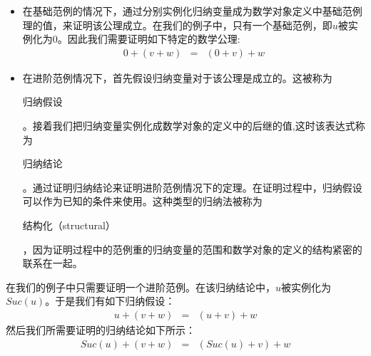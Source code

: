 \documentclass[twocolumn]{article}
\begin{document}
\begin{CJK}{UTF8}{gbsn}
\begin{itemize}
\item 在基础范例的情况下，通过分别实例化归纳变量成为数学对象定义中基础范例理的值，来证明该公理成立。在我们的例子中，只有一个基础范例，即$u$被实例化为$0$。因此我们需要证明如下特定的数学公理:
\begin{eqnarray*}
 0+(v+w) & = & (0+v)+w
\end{eqnarray*}
\item 在进阶范例情况下，首先假设归纳变量对于该公理是成立的。这被称为\begin{CJK}{UTF8}{gkai}归纳假设\end{CJK}。接着我们把归纳变量实例化成数学对象的定义中的后继的值,这时该表达式称为\begin{CJK}{UTF8}{gkai}归纳结论\end{CJK}。通过证明归纳结论来证明进阶范例情况下的定理。在证明过程中，归纳假设可以作为已知的条件来使用。这种类型的归纳法被称为\begin{CJK}{UTF8}{gkai}结构化（structural）\end{CJK}，因为证明过程中的范例重的归纳变量的范围和数学对象的定义的结构紧密的联系在一起。
\end{itemize}

\indent \indent 在我们的例子中只需要证明一个进阶范例。在该归纳结论中，$u$被实例化为$Suc(u)$。于是我们有如下归纳假设：
\begin{eqnarray}
 u+(v+w) & = & (u+v)+w \label{ih}
\end{eqnarray}
然后我们所需要证明的归纳结论如下所示：
\begin{eqnarray*}
 Suc(u)+(v+w) & = & (Suc(u)+v)+w
\end{eqnarray*}


\end{CJK}
\end{document}
